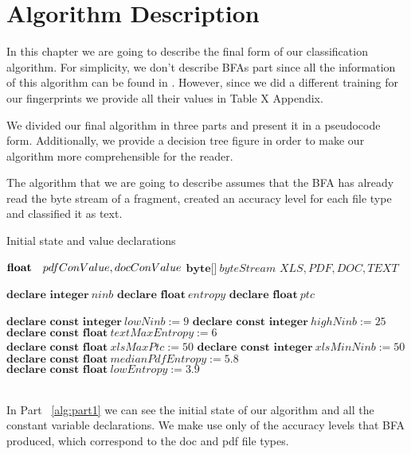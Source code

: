 \chapter{Algorithm Description}


\makeatletter
\renewcommand{\ALG@beginalgorithmic}{\footnotesize}
\renewcommand{\ALG@name}{Algorithm Part}
\makeatother


In this chapter we are going to describe the final form of our classification algorithm. For simplicity, we don't describe BFAs part since all the information of this algorithm can be found in \cite{MacDaniel}. However, since we did a different training for our fingerprints we provide all their values in Table X Appendix.

We divided our final algorithm in three parts and present it in a pseudocode form. Additionally, we provide a decision tree figure in order to make our algorithm more comprehensible for the reader.

The algorithm that we are going to describe assumes that the BFA has already read the byte stream of a fragment, created an accuracy level for each file type and classified it as text. 

\pagebreak

\begin{algorithm}
\caption{Initial state and value declarations\label{alg:part1}}
\begin{algorithmic}[1]

\Require$\newline \textbf{float} \ \ \ pdfConValue, docConValue$ 
\newline $\textbf{byte[]} \   byteStream$
\newline
\Ensure$XLS, PDF, DOC, TEXT$
\newline

\State$\textbf{declare integer} \ ninb$
\State$\textbf{declare float} \ entropy$
\State$\textbf{declare float} \ ptc$
\newline

\State$\textbf{declare const integer} \ lowNinb:= 9$
\State$\textbf{declare const integer} \ highNinb:= 25$
\State$\textbf{declare const float} \ textMaxEntropy:= 6 $
\State$\textbf{declare const float} \ xlsMaxPtc:= 50$
\State$\textbf{declare const integer} \ xlsMinNinb:= 50$
\State$\textbf{declare const float} \ medianPdfEntropy:= 5.8$
\State$\textbf{declare const float} \ lowEntropy:= 3.9$

\end{algorithmic}
\end{algorithm}
~\\
In Part ~\ref{alg:part1} we can see the initial state of our algorithm and all the constant variable declarations. We make use only of the accuracy levels that BFA produced, which correspond to the doc and pdf file types.

